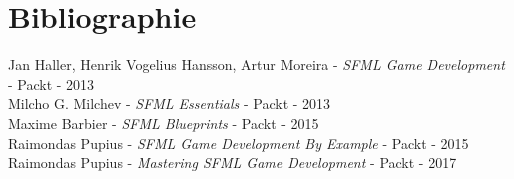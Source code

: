 \section{Bibliographie}
Jan Haller, Henrik Vogelius Hansson, Artur Moreira - \textit{SFML Game Development} - Packt - 2013 \\

Milcho G. Milchev - \textit{SFML Essentials} - Packt - 2013 \\

Maxime Barbier - \textit{SFML Blueprints} - Packt - 2015 \\

Raimondas Pupius - \textit{SFML Game Development By Example} - Packt - 2015 \\

Raimondas Pupius - \textit{Mastering SFML Game Development} - Packt - 2017
